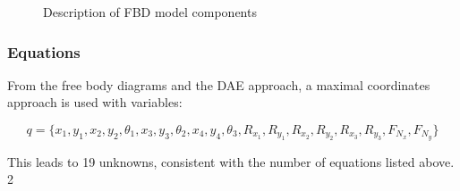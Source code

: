 \documentclass{article}
\begin{document}
\begin{figure}[h]
	\centering
	\qquad
	\qquad
	\qquad
	\caption{Description of FBD model components}%
	\label{fig:example2}%
\end{figure}
\subsubsection{Equations}
From the free body diagrams and the DAE approach, a maximal coordinates approach is used with variables:
\begin{center}
	\begin{equation}
		q=\{x_1,y_1,x_2,y_2,\theta_1,x_3,y_3,\theta_2,x_4,y_4,\theta_3,R_{x_1},R_{y_1},R_{x_2},R_{y_2},R_{x_3},R_{y_3},F_{N_x}, F_{N_y} \}
	\end{equation} 
\end{center}
This leads to 19 unknowns, consistent with the number of equations listed above.
2
\end{document}
